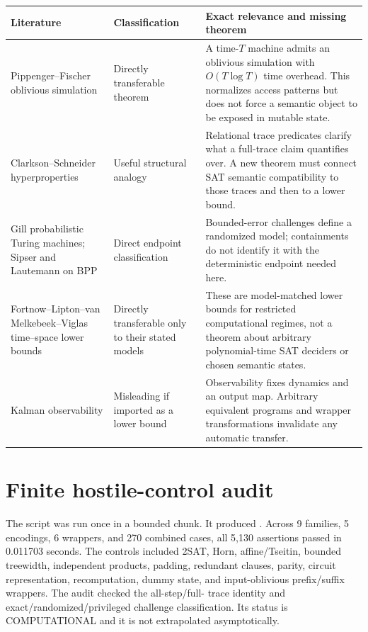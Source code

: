 \documentclass[11pt]{article}
\newcommand{\COMP}{\textsf{COMPUTATIONAL}}
\begin{document}
\begin{longtable}{p{}p{}p{}}
\toprule
Literature & Classification & Exact relevance and missing theorem\\
\midrule
Pippenger--Fischer oblivious simulation & Directly transferable theorem & A time-$T$ machine admits an oblivious simulation with $O(T\log T)$ time overhead.  This normalizes access patterns but does not force a semantic object to be exposed in mutable state.\\
Clarkson--Schneider hyperproperties & Useful structural analogy & Relational trace predicates clarify what a full-trace claim quantifies over.  A new theorem must connect SAT semantic compatibility to those traces and then to a lower bound.\\
Gill probabilistic Turing machines; Sipser and Lautemann on BPP & Direct endpoint classification & Bounded-error challenges define a randomized model; containments do not identify it with the deterministic endpoint needed here.\\
Fortnow--Lipton--van Melkebeek--Viglas time--space lower bounds & Directly transferable only to their stated models & These are model-matched lower bounds for restricted computational regimes, not a theorem about arbitrary polynomial-time SAT deciders or chosen semantic states.\\
Kalman observability & Misleading if imported as a lower bound & Observability fixes dynamics and an output map.  Arbitrary equivalent programs and wrapper transformations invalidate any automatic transfer.\\
\bottomrule
\end{longtable}

\section*{Finite hostile-control audit}
The script
was run once in a bounded chunk.  It produced
.
Across 9 families, 5 encodings, 6 wrappers, and 270 combined cases, all 5,130
assertions passed in 0.011703 seconds.  The controls included 2SAT, Horn,
affine/Tseitin, bounded treewidth, independent products, padding, redundant
clauses, parity, circuit representation, recomputation, dummy state, and
input-oblivious prefix/suffix wrappers.  The audit checked the all-step/full-
trace identity and exact/randomized/privileged challenge classification.  Its
status is \COMP{} and it is not extrapolated asymptotically.
\end{document}
